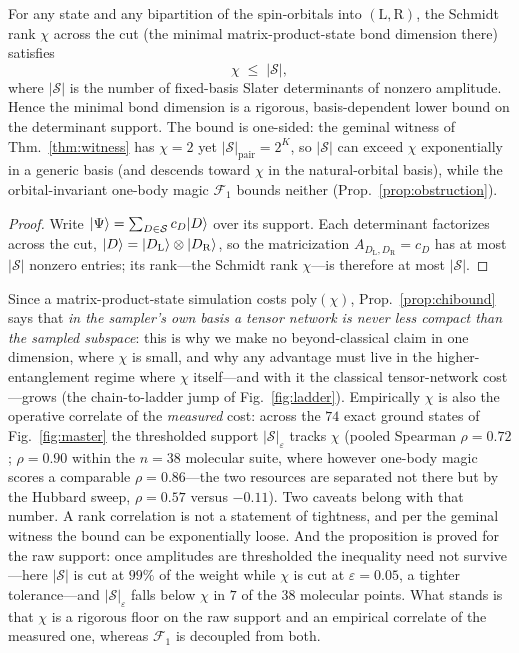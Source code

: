 \begin{proposition}
\label{prop:chibound}
For any state and any bipartition of the spin-orbitals into $(\mathrm L,\mathrm R)$, the Schmidt rank
$\chi$ across the cut (the minimal matrix-product-state bond dimension there) satisfies
\begin{equation}
\chi \;\le\; |\mathcal S|,
\end{equation}
where $|\mathcal S|$ is the number of fixed-basis Slater determinants of nonzero amplitude. Hence the
minimal bond dimension is a rigorous, basis-dependent lower bound on the determinant support. The bound is
one-sided: the geminal witness of Thm.~\ref{thm:witness} has $\chi=2$ yet $|\mathcal S|_{\mathrm{pair}}=2^{K}$,
so $|\mathcal S|$ can exceed $\chi$ exponentially in a generic basis (and descends toward $\chi$ in the
natural-orbital basis), while the orbital-invariant one-body magic $\mathcal F_1$ bounds neither
(Prop.~\ref{prop:obstruction}).
\end{proposition}
\begin{proof}
Write $\lvert \Psi \rangle=\sum_{D\in\mathcal S}c_D\lvert D \rangle$ over its support. Each determinant factorizes across the
cut, $\lvert D \rangle=\lvert D_{\mathrm L} \rangle\otimes\lvert D_{\mathrm R} \rangle$, so the matricization
$A_{D_{\mathrm L},D_{\mathrm R}}=c_D$ has at most $|\mathcal S|$ nonzero entries; its rank---the Schmidt
rank $\chi$---is therefore at most $|\mathcal S|$.
\end{proof}
\noindent Since a matrix-product-state simulation costs $\mathrm{poly}(\chi)$, Prop.~\ref{prop:chibound}
says that \emph{in the sampler's own basis a tensor network is never less compact than the sampled
subspace}: this is why we make no beyond-classical claim in one dimension, where $\chi$ is small, and why
any advantage must live in the higher-entanglement regime where $\chi$ itself---and with it the classical
tensor-network cost---grows (the chain-to-ladder jump of Fig.~\ref{fig:ladder}). Empirically $\chi$ is also the
operative correlate of the \emph{measured} cost: across the $74$ exact ground states of
Fig.~\ref{fig:master} the thresholded support $|\mathcal S|_\varepsilon$ tracks $\chi$ (pooled Spearman
$\rho=0.72$; $\rho=0.90$ within the $n=38$ molecular suite, where however one-body magic scores a
comparable $\rho=0.86$---the two resources are separated not there but by the Hubbard sweep, $\rho=0.57$
versus $-0.11$). Two caveats belong with that number. A rank correlation is not a statement of tightness,
and per the geminal witness the bound can be exponentially loose. And the proposition is proved for the
raw support: once amplitudes are thresholded the inequality need not survive---here $|\mathcal S|$ is cut
at $99\%$ of the weight while $\chi$ is cut at $\varepsilon=0.05$, a tighter tolerance---and
$|\mathcal S|_\varepsilon$ falls below $\chi$ in $7$ of the $38$ molecular points. What stands is that $\chi$ is a rigorous floor on
the raw support and an empirical correlate of the measured one, whereas $\mathcal F_1$ is decoupled from
both.

